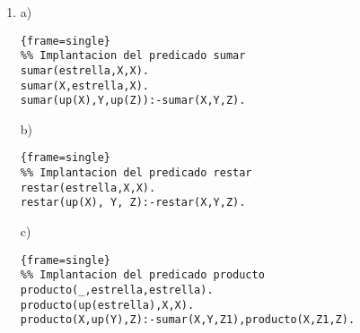 \documentclass[12pt,a4paper,spanish]{article}
\begin{document}
\begin{enumerate}
\item 
\newline
a) 
\newline
\lstset{language=prolog, breaklines=True, basicstyle=\footnotesize}
\begin{lstlisting}{frame=single}
%% Implantacion del predicado sumar
sumar(estrella,X,X).
sumar(X,estrella,X).
sumar(up(X),Y,up(Z)):-sumar(X,Y,Z).
\end{lstlisting}
\newline
\newline
b) 
\lstset{language=prolog, breaklines=True, basicstyle=\footnotesize}
\begin{lstlisting}{frame=single}
%% Implantacion del predicado restar
restar(estrella,X,X).
restar(up(X), Y, Z):-restar(X,Y,Z).
\end{lstlisting}
\newline
\newline
c) 
\lstset{language=prolog, breaklines=True, basicstyle=\footnotesize}
\begin{lstlisting}{frame=single}
%% Implantacion del predicado producto
producto(_,estrella,estrella).
producto(up(estrella),X,X).
producto(X,up(Y),Z):-sumar(X,Y,Z1),producto(X,Z1,Z).
\end{lstlisting}


\end{enumerate}
\end{document}
